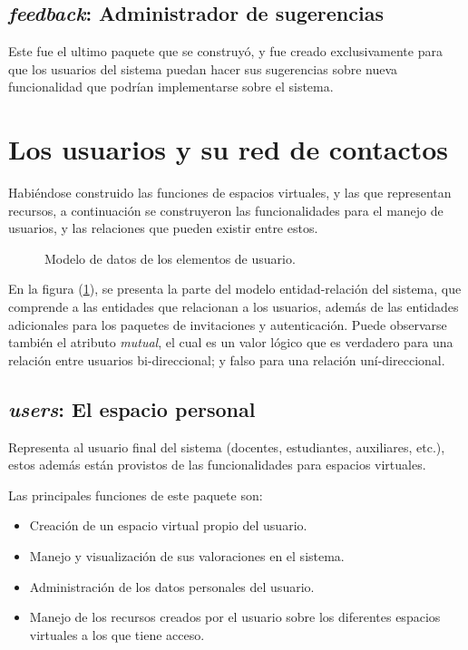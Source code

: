 \subsection{\emph{feedback}: Administrador de sugerencias}
Este fue el ultimo paquete que se construyó, y fue creado exclusivamente para
que los usuarios del sistema puedan hacer sus sugerencias sobre nueva
funcionalidad que podrían implementarse sobre el sistema.

\section{Los usuarios y su red de contactos}
Habiéndose construido las funciones de espacios virtuales, y las que representan
recursos, a continuación se construyeron las funcionalidades para el manejo de
usuarios, y las relaciones que pueden existir entre estos.

\begin{figure}
\centering

\caption{Modelo de datos de los elementos de usuario.}
\label{modelo5}
\end{figure}

En la figura (\ref{modelo5}), se presenta la parte del modelo entidad-relación
del sistema, que comprende a las entidades que relacionan a los usuarios, además
de las entidades adicionales para los paquetes de invitaciones y
autenticación. Puede observarse también el atributo \emph{mutual}, el cual es
un valor lógico que es verdadero para una relación entre usuarios
bi-direccional; y falso para una relación uní-direccional.

\subsection{\emph{users}: El espacio personal}
Representa al usuario final del sistema (docentes, estudiantes, auxiliares,
etc.), estos además están provistos de las funcionalidades para espacios
virtuales.

Las principales funciones de este paquete son:

\begin{itemize}
\item Creación de un espacio virtual propio del usuario.
\item Manejo y visualización de sus valoraciones en el sistema.
\item Administración de los datos personales del usuario.
\item Manejo de los recursos creados por el usuario sobre los diferentes
espacios virtuales a los que tiene acceso.
\end{itemize}

